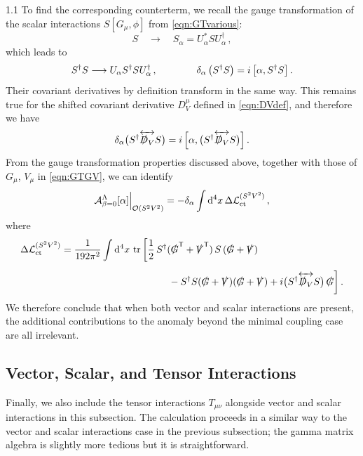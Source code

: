 \documentclass[a4paper,12pt]{article}
\def\L{{\cal L}}
\def\O{{\cal O}}
\def\Acal{{\cal A}}
\def\T{\textsf{T}}
\def\Dsl{\slashed{D}}
\def\Gsl{\slashed{G}}
\def\Vsl{\slashed{V}}
\begin{document}
\begin{spacing}{1.1}
To find the corresponding counterterm, we recall the gauge transformation of the scalar interactions $S[G_\mu, \phi]$ from \cref{eqn:GTvarious}:
\begin{equation}
S \quad\longrightarrow\quad
S_\alpha = U_\alpha^* S U_\alpha^\dagger \,,
\end{equation}
which leads to
\begin{equation}
S^\dagger S \longrightarrow U_\alpha S^\dagger S U_\alpha^\dagger \,,
\qquad\qquad
\delta_\alpha \left( S^\dagger S \right) = i\,\comm{\alpha}{S^\dagger S} \,.
\end{equation}
Their covariant derivatives by definition transform in the same way. This remains true for the shifted covariant derivative $D_V^\mu$ defined in \cref{eqn:DVdef}, and therefore we have
\begin{equation}
\delta_\alpha \big( S^\dagger \overleftrightarrow{\Dsl_V} S \big) = i\,\comm{\alpha}{\big( S^\dagger \overleftrightarrow{\Dsl_V} S \big)} \,.
\end{equation}
From the gauge transformation properties discussed above, together with those of $G_\mu$, $V_\mu$ in \cref{eqn:GTGV}, we can identify
\begin{equation}
\Acal_{\beta=0}^\Lambda[\alpha]\Bigr|_{\O(S^2V^2)} = -\delta_\alpha \int \dd^4x \,\Delta\L_\text{ct}^{(S^2V^2)} \,,
\end{equation}
where
\begin{align}
\Delta\L_\text{ct}^{(S^2V^2)} &= \frac{1}{192\pi^2} \int \dd^4x\, \tr \bigg[
\frac12\, S^\dagger (\Gsl^\T + \Vsl^\T )\, S\, (\Gsl + \Vsl )
\notag\\[5pt]
&\hspace{110pt}
- S^\dagger S (\Gsl + \Vsl) (\Gsl + \Vsl)
+ i\big( S^\dagger \overleftrightarrow{\Dsl_V} S \big)\, \Gsl \bigg] \,.
\label{eq:LctS2V2}
\end{align}
We therefore conclude that when both vector and scalar interactions are present, the additional contributions to the anomaly beyond the minimal coupling case are all irrelevant.


\subsection{Vector, Scalar, and Tensor Interactions}
\label{subsec:Tensor}

Finally, we also include the tensor interactions $T_{\mu\nu}$ alongside vector and scalar interactions in this subsection. The calculation proceeds in a similar way to the vector and scalar interactions case in the previous subsection; the gamma matrix algebra is slightly more tedious but it is straightforward.


\end{spacing}
\end{document}
